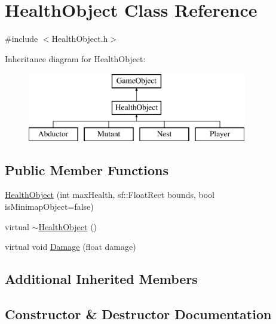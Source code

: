 \hypertarget{class_health_object}{}\section{Health\+Object Class Reference}
\label{class_health_object}


{\ttfamily \#include $<$Health\+Object.\+h$>$}

Inheritance diagram for Health\+Object\+:\begin{figure}[H]
\begin{center}
\leavevmode
\includegraphics[height=3.000000cm]{class_health_object}
\end{center}
\end{figure}
\subsection*{Public Member Functions}
\begin{DoxyCompactItemize}
\item 
\hyperlink{class_health_object_af17b24dba0a4c4ff7c51b56124bad93a}{Health\+Object} (int max\+Health, sf\+::\+Float\+Rect bounds, bool is\+Minimap\+Object=false)
\item 
virtual \hyperlink{class_health_object_ac19c296f497bfca614d4742bafb4db9a}{$\sim$\+Health\+Object} ()
\item 
virtual void \hyperlink{class_health_object_a782acdc8ee8f50ce7e4a7b76b2b474be}{Damage} (float damage)
\end{DoxyCompactItemize}
\subsection*{Additional Inherited Members}


\subsection{Constructor \& Destructor Documentation}
\hypertarget{class_health_object_af17b24dba0a4c4ff7c51b56124bad93a}{}\label{class_health_object_af17b24dba0a4c4ff7c51b56124bad93a} 
